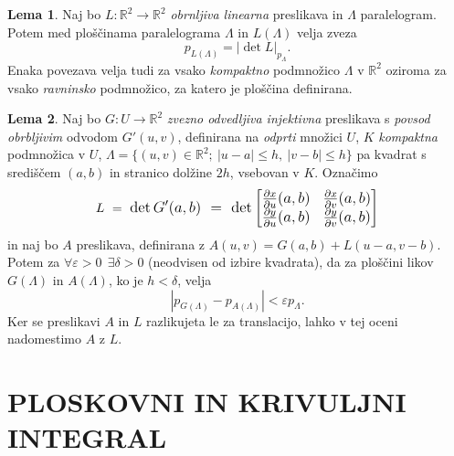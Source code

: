 \documentclass[11pt]{article}
\theoremstyle{definition}
\theoremstyle{definition}
\theoremstyle{definition}
\newtheorem{lema}{Lema}
\begin{document}
\begin{lema}

Naj bo $L: \mathbb{R}^2 \rightarrow \mathbb{R}^2$ \textit{obrnljiva linearna} preslikava in $\Lambda$ paralelogram. Potem med ploščinama paralelograma $\Lambda$ in $L(\Lambda)$ velja zveza
\begin{equation} \label{eq:7}
	p_{L(\Lambda)} = |\det{L}|_{p_{\Lambda}}.
\end{equation}
Enaka povezava velja tudi za vsako \textit{kompaktno} podmnožico $\Lambda$ v $\mathbb{R}^2$ oziroma za vsako \textit{ravninsko} podmnožico, za katero je ploščina definirana.

\end{lema}
\vspace{0.5cm}

\begin{lema}

Naj bo $G: U \rightarrow \mathbb{R}^2$ \textit{zvezno odvedljiva injektivna} preslikava s \textit{povsod obrbljivim} odvodom $G'(u, v)$, definirana na \textit{odprti} množici $U$, $K$ \textit{kompaktna} podmnožica v $U$, $\Lambda = \{ (u, v) \in \mathbb{R}^2; ~|u - a| \leq h, ~|v - b| \leq h \}$ pa kvadrat s središčem $(a, b)$ in stranico dolžine $2h$, vsebovan v $K$. Označimo
$$L ~=~ \mathlarger{\det{G'(a, b)} ~=~ \det{\begin{bmatrix}
\frac{\partial x}{\partial u}(a, b) & \frac{\partial x}{\partial v}(a, b) \\
\frac{\partial y}{\partial u}(a, b) & \frac{\partial y}{\partial v}(a, b)
\end{bmatrix}}}$$
in naj bo $A$ preslikava, definirana z $A(u, v) = G(a, b) + L(u-a,v-b)$. Potem za $\forall \varepsilon > 0 ~~\exists \delta > 0$ (neodvisen od izbire kvadrata), da za ploščini likov $G(\Lambda)$ in $A(\Lambda)$, ko je $h < \delta$, velja
$$|p_{G(\Lambda)} - p_{A(\Lambda)}| < \varepsilon p_{\Lambda}.$$
Ker se preslikavi $A$ in $L$ razlikujeta le za translacijo, lahko v tej oceni nadomestimo $A$ z $L$.

\end{lema}
\vspace{0.5cm}


\pagebreak


\section{PLOSKOVNI IN KRIVULJNI INTEGRAL}
\vspace{0.5cm}
\end{document}
